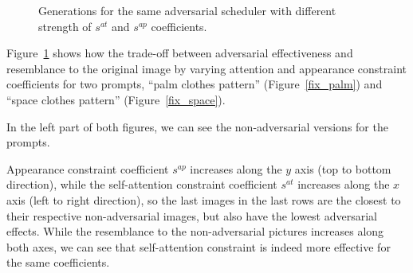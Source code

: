 \begin{figure}[htp]
\hfill
{}
\caption{Generations for the same adversarial scheduler with different strength of $s^{at}$ and $s^{ap}$ coefficients.}\label{fix_ex}
\end{figure}

Figure~\ref{fix_ex} shows how the trade-off between adversarial effectiveness and resemblance to the original image by varying attention and appearance constraint coefficients for two prompts, ``palm clothes pattern'' (Figure~\ref{fix_palm}) and ``space clothes pattern'' (Figure~\ref{fix_space}).

In the left part of both figures, we can see the non-adversarial versions for the prompts.

Appearance constraint coefficient $s^{ap}$ increases along the $y$ axis (top to bottom direction), while the self-attention constraint coefficient $s^{at}$ increases along the $x$ axis (left to right direction), so the last images in the last rows are the closest to their respective non-adversarial images, but also have the lowest adversarial effects.
While the resemblance to the non-adversarial pictures increases along both axes, we can see that self-attention constraint is indeed more effective for the same coefficients.

